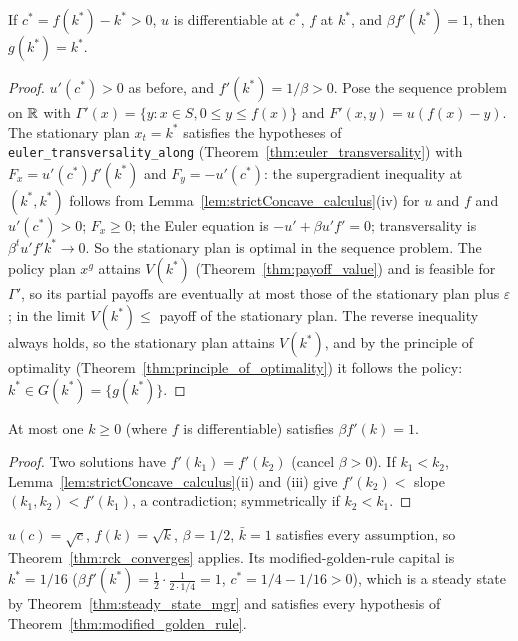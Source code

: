\begin{theorem}
\label{thm:steady_state_mgr}
\leanok
{}
If $c^* = f(k^*) - k^* > 0$, $u$ is differentiable at $c^*$, $f$ at $k^*$, and $\beta f'(k^*) = 1$, then $g(k^*) = k^*$.
\end{theorem}
\begin{proof}
\leanok
$u'(c^*) > 0$ as before, and $f'(k^*) = 1/\beta > 0$. Pose the sequence problem on $\mathbb{R}$ with $\Gamma'(x) = \{y : x \in S,
0 \le y \le f(x)\}$ and $F'(x, y) = u(f(x) - y)$. The stationary plan $x_t = k^*$ satisfies the hypotheses of
\texttt{euler\_transversality\_along} (Theorem~\ref{thm:euler_transversality}) with $F_x = u'(c^*) f'(k^*)$ and
$F_y = -u'(c^*)$: the supergradient inequality at $(k^*, k^*)$ follows from Lemma~\ref{lem:strictConcave_calculus}(iv)
for $u$ and $f$ and $u'(c^*) > 0$; $F_x \ge 0$; the Euler equation is $-u' + \beta u' f' = 0$; transversality is
$\beta^t u' f' k^* \to 0$. So the stationary plan is optimal in the sequence problem. The policy plan $x^g$ attains
$V(k^*)$ (Theorem~\ref{thm:payoff_value}) and is feasible for $\Gamma'$, so its partial payoffs are eventually at most
those of the stationary plan plus $\varepsilon$; in the limit $V(k^*) \le$ payoff of the stationary plan. The reverse
inequality always holds, so the stationary plan attains $V(k^*)$, and by the principle of optimality
(Theorem~\ref{thm:principle_of_optimality}) it follows the policy: $k^* \in G(k^*) = \{g(k^*)\}$.
\end{proof}

\begin{theorem}
\label{thm:mgr_unique}
\leanok
{}
At most one $k \ge 0$ (where $f$ is differentiable) satisfies $\beta f'(k) = 1$.
\end{theorem}
\begin{proof}
\leanok
Two solutions have $f'(k_1) = f'(k_2)$ (cancel $\beta > 0$). If $k_1 < k_2$, Lemma~\ref{lem:strictConcave_calculus}(ii)
and (iii) give $f'(k_2) <$ slope$(k_1, k_2) < f'(k_1)$, a contradiction; symmetrically if $k_2 < k_1$.
\end{proof}

\begin{remark}
\label{rem:rck_example}
\leanok
{}
$u(c) = \sqrt c$, $f(k) = \sqrt k$, $\beta = 1/2$, $\bar k = 1$ satisfies every assumption, so
Theorem~\ref{thm:rck_converges} applies. Its modified-golden-rule capital is $k^* = 1/16$ ($\beta f'(k^*) =
\tfrac12 \cdot \tfrac{1}{2 \cdot 1/4} = 1$, $c^* = 1/4 - 1/16 > 0$), which is a steady state by
Theorem~\ref{thm:steady_state_mgr} and satisfies every hypothesis of Theorem~\ref{thm:modified_golden_rule}.
\end{remark}

